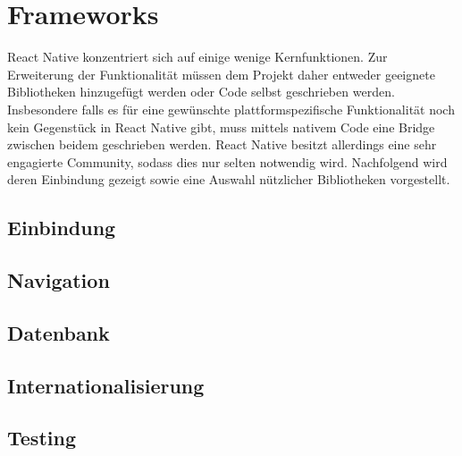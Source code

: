 \section{Frameworks}
React Native konzentriert sich auf einige wenige Kernfunktionen. Zur Erweiterung der Funktionalität müssen dem Projekt daher entweder geeignete Bibliotheken hinzugefügt werden oder Code selbst geschrieben werden. Insbesondere falls es für eine gewünschte plattformspezifische Funktionalität noch kein Gegenstück in React Native gibt, muss mittels nativem Code eine Bridge zwischen beidem geschrieben werden. React Native besitzt allerdings eine sehr engagierte Community, sodass dies nur selten notwendig wird. Nachfolgend wird deren Einbindung gezeigt sowie eine Auswahl nützlicher Bibliotheken vorgestellt.

\subsection{Einbindung}

\subsection{Navigation}

\subsection{Datenbank}

\subsection{Internationalisierung}

\subsection{Testing}